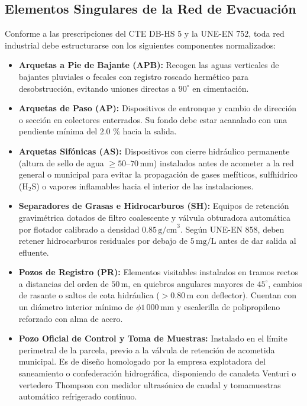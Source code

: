 \documentclass{report}
\begin{document}
\subsection{Elementos Singulares de la Red de Evacuación}
Conforme a las prescripciones del CTE DB-HS 5 y la UNE-EN 752, toda red industrial debe estructurarse con los siguientes componentes normalizados:
\begin{itemize}
    \item \textbf{Arquetas a Pie de Bajante (APB):} Recogen las aguas verticales de bajantes pluviales o fecales con registro roscado hermético para desobstrucción, evitando uniones directas a $90^\circ$ en cimentación.
    \item \textbf{Arquetas de Paso (AP):} Dispositivos de entronque y cambio de dirección o sección en colectores enterrados. Su fondo debe estar acanalado con una pendiente mínima del $2.0\text{ \%}$ hacia la salida.
    \item \textbf{Arquetas Sifónicas (AS):} Dispositivos con cierre hidráulico permanente (altura de sello de agua $\ge 50\text{--}70\,\text{mm}$) instalados antes de acometer a la red general o municipal para evitar la propagación de gases mefíticos, sulfhídrico ($\text{H}_2\text{S}$) o vapores inflamables hacia el interior de las instalaciones.
    \item \textbf{Separadores de Grasas e Hidrocarburos (SH):} Equipos de retención gravimétrica dotados de filtro coalescente y válvula obturadora automática por flotador calibrado a densidad $0.85\,\text{g/cm}^3$. Según UNE-EN 858, deben retener hidrocarburos residuales por debajo de $5\,\text{mg/L}$ antes de dar salida al efluente.
    \item \textbf{Pozos de Registro (PR):} Elementos visitables instalados en tramos rectos a distancias del orden de $50\,\text{m}$, en quiebros angulares mayores de $45^\circ$, cambios de rasante o saltos de cota hidráulica ($> 0.80\,\text{m}$ con deflector). Cuentan con un diámetro interior mínimo de $\phi 1\,000\,\text{mm}$ y escalerilla de polipropileno reforzado con alma de acero.
    \item \textbf{Pozo Oficial de Control y Toma de Muestras:} Instalado en el límite perimetral de la parcela, previo a la válvula de retención de acometida municipal. Es de diseño homologado por la empresa explotadora del saneamiento o confederación hidrográfica, disponiendo de canaleta Venturi o vertedero Thompson con medidor ultrasónico de caudal y tomamuestras automático refrigerado continuo.
\end{itemize}
\end{document}
